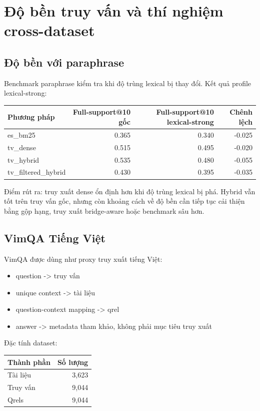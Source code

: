 \documentclass[11pt,a4paper]{article}
\begin{document}
\section{Độ bền truy vấn và thí nghiệm cross-dataset}

\subsection{Độ bền với paraphrase}

Benchmark paraphrase kiểm tra khi độ trùng lexical bị thay đổi. Kết quả profile lexical-strong:

\begin{tabularx}{\textwidth}{>{\ttfamily\raggedright\arraybackslash}p{} r r r}
\toprule
Phương pháp & Full-support@10 gốc & Full-support@10 lexical-strong & Chênh lệch \\
\midrule
es\_bm25 & 0.365 & 0.340 & -0.025 \\
tv\_dense & 0.515 & 0.495 & -0.020 \\
tv\_hybrid & 0.535 & 0.480 & -0.055 \\
tv\_filtered\_hybrid & 0.430 & 0.395 & -0.035 \\
\bottomrule
\end{tabularx}

Điểm rút ra: truy xuất dense ổn định hơn khi độ trùng lexical bị phá. Hybrid vẫn tốt trên truy vấn
gốc, nhưng còn khoảng cách về độ bền cần tiếp tục cải thiện bằng gộp hạng, truy xuất bridge-aware hoặc benchmark
sâu hơn.

\subsection{VimQA Tiếng Việt}

VimQA được dùng như proxy truy xuất tiếng Việt:

\begin{itemize}
  \item question -> truy vấn
  \item unique context -> tài liệu
  \item question-context mapping -> qrel
  \item answer -> metadata tham khảo, không phải mục tiêu truy xuất
\end{itemize}

Đặc tính dataset:

\begin{tabular}{lr}
\toprule
Thành phần & Số lượng \\
\midrule
Tài liệu & 3,623 \\
Truy vấn & 9,044 \\
Qrels & 9,044 \\
\bottomrule
\end{tabular}
\end{document}
